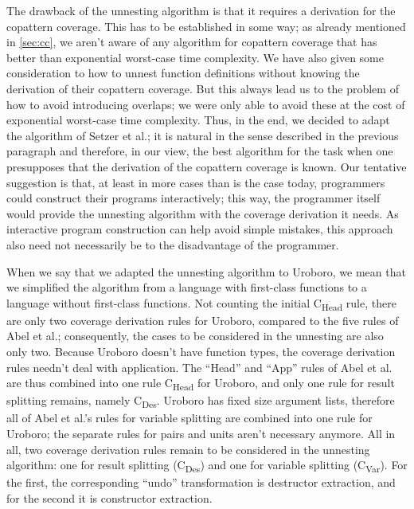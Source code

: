 The drawback of the unnesting algorithm is that it requires a derivation for the copattern coverage. This has to be established in some way; as already mentioned in \autoref{sec:cc}, we aren't aware of any algorithm for copattern coverage that has better than exponential worst-case time complexity. We have also given some consideration to how to unnest function definitions without knowing the derivation of their copattern coverage. But this always lead us to the problem of how to avoid introducing overlaps; we were only able to avoid these at the cost of exponential worst-case time complexity. Thus, in the end, we decided to adapt the algorithm of Setzer et al.; it is natural in the sense described in the previous paragraph and therefore, in our view, the best algorithm for the task when one presupposes that the derivation of the copattern coverage is known. Our tentative suggestion is that, at least in more cases than is the case today, programmers could construct their programs interactively; this way, the programmer itself would provide the unnesting algorithm with the coverage derivation it needs. As interactive program construction can help avoid simple mistakes, this approach also need not necessarily be to the disadvantage of the programmer.

When we say that we adapted the unnesting algorithm to Uroboro, we mean that we simplified the algorithm from a language with first-class functions to a language without first-class functions. Not counting the initial C\textsubscript{Head} rule, there are only two coverage derivation rules for Uroboro, compared to the five rules of Abel et al.; consequently, the cases to be considered in the unnesting are also only two. Because Uroboro doesn't have function types, the coverage derivation rules needn't deal with application. The ``Head'' and ``App'' rules of Abel et al. are thus combined into one rule C\textsubscript{Head} for Uroboro, and only one rule for result splitting remains, namely C\textsubscript{Des}. Uroboro has fixed size argument lists, therefore all of Abel et al.'s rules for variable splitting are combined into one rule for Uroboro; the separate rules for pairs and units aren't necessary anymore. All in all, two coverage derivation rules remain to be considered in the unnesting algorithm: one for result splitting (C\textsubscript{Des}) and one for variable splitting (C\textsubscript{Var}). For the first, the corresponding ``undo'' transformation is destructor extraction, and for the second it is constructor extraction.

